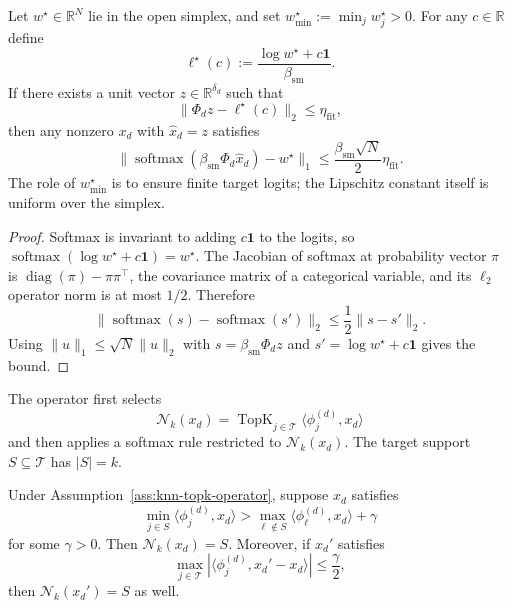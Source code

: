 \begin{lemma}
\label{lem:softmax-reachability}
Let $w^\star\in\mathbb{R}^{N}$ lie in the open simplex, and set $w^\star_{\min}:=\min_j w^\star_j>0$. For any $c\in\mathbb{R}$ define
\[
\ell^\star(c):=\frac{\log w^\star+c\mathbf{1}}{\beta_{\mathrm{sm}}}.
\]
If there exists a unit vector $z\in\mathbb{R}^{\delta_d}$ such that
\[
\|\Phi_d z-\ell^\star(c)\|_2\le \eta_{\mathrm{fit}},
\]
then any nonzero $x_d$ with $\widehat{x}_d=z$ satisfies
\[
\|\operatorname{softmax}(\beta_{\mathrm{sm}}\Phi_d\widehat{x}_d)-w^\star\|_1
\le
\frac{\beta_{\mathrm{sm}}\sqrt{N}}{2}\eta_{\mathrm{fit}}.
\]
The role of $w^\star_{\min}$ is to ensure finite target logits; the Lipschitz constant itself is uniform over the simplex.
\end{lemma}

\begin{proof}
Softmax is invariant to adding $c\mathbf{1}$ to the logits, so $\operatorname{softmax}(\log w^\star+c\mathbf{1})=w^\star$. The Jacobian of softmax at probability vector $\pi$ is $\operatorname{diag}(\pi)-\pi\pi^\top$, the covariance matrix of a categorical variable, and its $\ell_2$ operator norm is at most $1/2$. Therefore
\[
\|\operatorname{softmax}(s)-\operatorname{softmax}(s')\|_2
\le
\frac{1}{2}\|s-s'\|_2.
\]
Using $\|u\|_1\le\sqrt{N}\|u\|_2$ with $s=\beta_{\mathrm{sm}}\Phi_d z$ and $s'=\log w^\star+c\mathbf{1}$ gives the bound.
\end{proof}

\begin{assumption}
\label{ass:knn-topk-operator}
The operator first selects
\[
\mathcal{N}_k(x_d)=\operatorname{TopK}_{j\in\mathcal{T}}\langle \phi_j^{(d)},x_d\rangle
\]
and then applies a softmax rule restricted to $\mathcal{N}_k(x_d)$. The target support $S\subseteq\mathcal{T}$ has $|S|=k$.
\end{assumption}

\begin{lemma}
\label{lem:margin-stable-knn}
Under Assumption~\ref{ass:knn-topk-operator}, suppose $x_d$ satisfies
\[
\min_{j\in S}\langle \phi_j^{(d)},x_d\rangle
>
\max_{\ell\notin S}\langle \phi_\ell^{(d)},x_d\rangle+\gamma
\]
for some $\gamma>0$. Then $\mathcal{N}_k(x_d)=S$. Moreover, if $x_d'$ satisfies
\[
\max_{j\in\mathcal{T}}
|\langle \phi_j^{(d)},x_d'-x_d\rangle|
\le
\frac{\gamma}{2},
\]
then $\mathcal{N}_k(x_d')=S$ as well.
\end{lemma}

